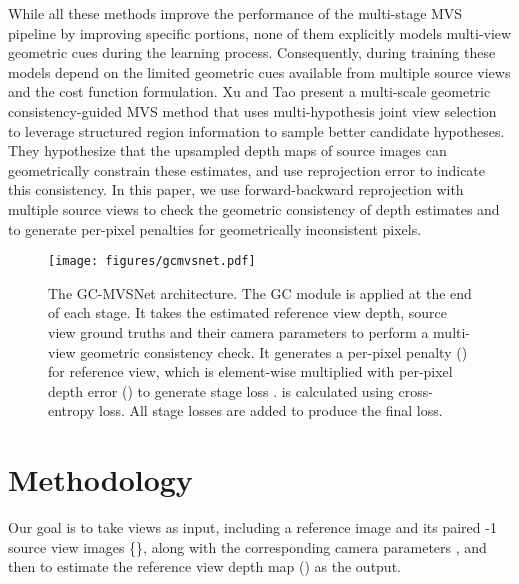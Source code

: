 \documentclass[10pt,twocolumn,letterpaper]{article}
\begin{document}
While all these methods improve the performance
of the multi-stage MVS pipeline by improving specific portions, none
of them explicitly models multi-view geometric cues during the learning
process. Consequently, during training these models depend  on the limited
geometric cues available from multiple source views and the cost function
formulation.
Xu and Tao \cite{xu2019multiscale} present a multi-scale geometric
consistency-guided MVS method that uses multi-hypothesis joint view
selection to leverage structured region information to sample better
candidate hypotheses. They hypothesize that the upsampled depth maps
of source images can geometrically constrain these estimates, and use reprojection error \cite{Johannes2016pixelwise,
  zhang2008consistentvideo} to indicate this consistency. In this
paper, we use forward-backward reprojection with multiple source
views to check the geometric consistency of depth estimates and to generate
per-pixel penalties for geometrically inconsistent pixels. 


\begin{figure*}[t]
\vspace{-5pt}
\begin{center}
    \texttt{[image: figures/gcmvsnet.pdf]}
    \vspace{-14pt}
    \caption{The GC-MVSNet architecture. The GC module is applied at the end of each stage. It takes the estimated reference view depth,  source view ground truths and their camera parameters to perform a multi-view geometric consistency check. It generates a per-pixel penalty () for reference view, which is element-wise multiplied with per-pixel depth error () to generate stage loss .  is calculated using cross-entropy loss. All stage losses are added to produce the final loss.}
    \label{fig:gc-mvsnet architecture}
    \vspace{-25pt}
\end{center}
\end{figure*}

\section{Methodology}\label{sec:methodology}

Our goal is to take
 views as input, including a
reference image \textbf{} and
its paired -1 source view images \{\textbf{}\},
along with the corresponding camera parameters , 
and then   to estimate the reference view depth
map () as the output.
\end{document}
